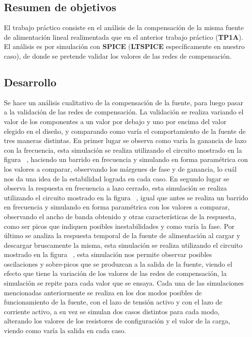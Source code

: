 
\subsection{Resumen de objetivos}


\normalfont

El trabajo práctico consiste en el análisis de la compensación de la misma fuente de alimentación lineal realimentada que en el anterior trabajo práctico (\textbf{TP1A}). El análisis es por simulación con \textbf{SPICE} (\textbf{LTSPICE} específicamente en nuestro caso), de donde se pretende validar los valores de las redes de compensación.


\subsection{Desarrollo}

Se hace un análisis cualitativo de la compensación de la fuente, para luego pasar a la validación de las redes de compensación. La validación se realiza variando el valor de los componentes a un valor por debajo y uno por encima del valor elegido en el diseño, y comparando como varía el comportamiento de la fuente de tres maneras distintas. En primer lugar se observa como varía la ganancia de lazo con la frecuencia, esta simulación se realiza utilizando el circuito mostrado en la figura~ , haciendo un barrido en frecuencia y simulando en forma paramétrica con los valores a comparar, observando los márgenes de fase y de ganancia, lo cuál nos da una idea de la estabilidad lograda en cada caso. En segundo lugar se observa la respuesta en frecuencia a lazo cerrado, esta simulación se realiza utilizando el circuito mostrado en la figura~ , igual que antes se realiza un barrido en frecuencia y simulando en forma paramétrica con los valores a comparar, observando el ancho de banda obtenido y otras características de la respuesta, como ser picos que indiquen posibles inestabilidades y como varía la fase. Por último se analiza la respuesta temporal de la fuente de alimentación al cargar y descargar bruscamente la misma, esta simulación se realiza utilizando el circuito mostrado en la figura~ , esta simulación nos permite observar posibles oscilaciones y sobre-picos que se produzcan a la salida de la fuente, viendo el efecto que tiene la variación de los valores de las redes de compensación, la simulación se repite para cada valor que se ensaya. Cada una de las simulaciones mencionadas anteriormente se realiza en los dos modos posibles de funcionamiento de la fuente, con el lazo de tensión activo y con el lazo de corriente activo, a su vez se simulan dos casos distintos para cada modo, alterando los valores de los resistores de configuración y el valor de la carga, viendo como varía la salida en cada caso.


